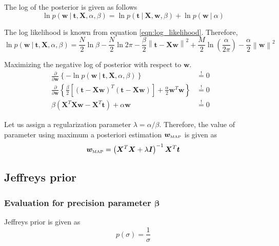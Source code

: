 \documentclass[11pt]{article}
\newcommand{\eye}{\bm{I}}
\newcommand{\map}[1]{{#1}_{\text{\tiny MAP}}}
\newcommand\given[1][]{\:#1\vert\:}
\newcommand{\norm}[1]{\left\lVert#1\right\rVert}
\begin{document}
The log of the posterior is given as follows
\begin{equation}
    \ln{p(\bm{w} \given \bm{t}, \bm{X}, \alpha, \beta)} = 
    \ln{p(\bm{t} \given \bm{X}, \bm{w}, \beta)} + \ln{p(\bm{w} \given \alpha)}
\end{equation}

The log likelihood is known from equation \ref{eqn:log_likelihood}. Therefore, 
\begin{equation} \label{eqn:log_posterior}
    \ln{p(\bm{w} \given \bm{t}, \bm{X}, \alpha, \beta)} = \frac{N}{2}\ln{\beta} - \frac{N}{2}\ln{2\pi} - \frac{\beta}{2} \norm{\bm{t} - \bm{Xw}}^2 + \frac{M}{2} \ln{\left( \frac{\alpha}{2\pi} \right)} - \frac{\alpha}{2}\norm{\bm{w}}^2
\end{equation}


Maximizing the negative log of posterior with respect to $\bm{w}$.
\begin{eqnarray}
    \frac{\partial }{\partial  \bm{w}} \left\{ -\ln{p(\bm{w} \given \bm{t}, \bm{X}, \alpha, \beta)} \right\} 
    &\overset{!}{=} 0& \\
    \frac{\partial }{\partial \bm{w}} \left\{\frac{\beta}{2} \left[ \left(\bm{t} - \bm{X}\bm{w}\right)^T \left(\bm{t} - \bm{X}\bm{w}\right)\right] + \frac{\alpha}{2}\bm{w}^T\bm{w}\right\}
    &\overset{!}{=} 0& \\
    \beta \left( \bm{X}^T\bm{X}\bm{w} - \bm{X}^T \bm{t} \right) + \alpha\bm{w}
    &\overset{!}{=} 0& 
\end{eqnarray}

Let us assign a regularization parameter $\lambda = \alpha/\beta$. Therefore, the value of parameter using maximum a posteriori estimation $\map{\bm{w}}$ is given as
\begin{equation} \label{eqn:w_map}
    \map{\bm{w}} = \left(\bm{X}^T\bm{X} + \lambda\eye\right)^{-1}\bm{X}^T\bm{t}
\end{equation}

\subsection{Jeffreys prior}
\subsubsection{Evaluation for precision parameter $\bm{\beta}$}

Jeffreys prior is given as
\begin{equation}
    p(\sigma) = \frac{1}{\sigma} 
\end{equation}
\end{document}
